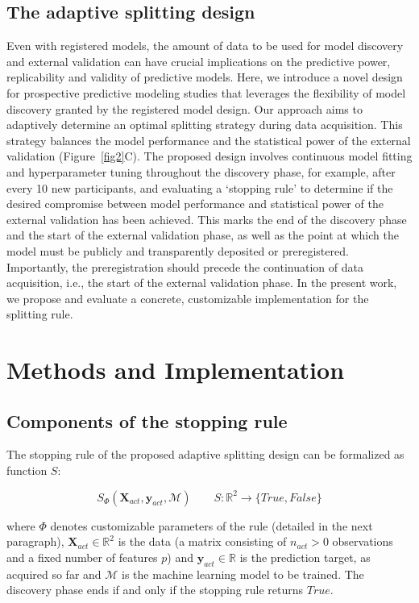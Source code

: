 \documentclass{article}
\begin{document}
\subsection{The adaptive splitting design}

Even with registered models, the amount of data to be used for model discovery and external validation can have crucial implications on the predictive power, replicability and validity of predictive models. Here, we introduce a novel design for prospective predictive modeling studies that leverages the flexibility of model discovery granted by the registered model design. Our approach aims to adaptively determine an optimal splitting strategy during data acquisition. This strategy balances the model performance and the statistical power of the external validation (Figure~\ref{fig2}C). The proposed design involves continuous model fitting and hyperparameter tuning throughout the discovery phase, for example, after every 10 new participants, and evaluating a `stopping rule' to determine if the desired compromise between model performance and statistical power of the external validation has been achieved. This marks the end of the discovery phase and the start of the external validation phase, as well as the point at which the model must be publicly and transparently deposited or preregistered. Importantly, the preregistration should precede the continuation of data acquisition, i.e., the start of the external validation phase.
In the present work, we propose and evaluate a concrete, customizable implementation for the splitting rule.

\section{Methods and Implementation}

\subsection{Components of the stopping rule}

The stopping rule of the proposed adaptive splitting design can be formalized as function $S$:

\begin{equation}
S_\Phi(\mathbf{X}_{act}, \mathbf{y}_{act}, \mathcal{M}) \quad \quad S: \mathbb{R}^2 \longrightarrow \{True, False\}
\end{equation}

where $\Phi$ denotes customizable parameters of the rule (detailed in the next paragraph), $\mathbf{X}_{act} \in \mathbb{R}^2$ is the data (a matrix consisting of $n_{act} > 0$ observations and a fixed number of features $p$) and $\mathbf{y}_{act} \in \mathbb{R}$ is the prediction target, as acquired so far and $\mathcal{M}$ is the machine learning model to be trained. The discovery phase ends if and only if the stopping rule returns $True$.
\end{document}
